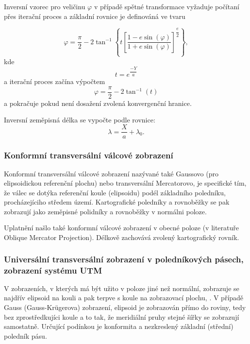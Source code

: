\documentclass[11pt,a4paper]{article}
\begin{document}
Inversní vzorec pro veličinu $\varphi$ v případě spětné transformace vyžaduje počítaní přes iterační proces a základní rovnice je definováná ve tvaru \cite{Snyder1987}

\begin{equation}
\varphi = \dfrac{\pi}{2} - 2 \tan^{-1}{\left\lbrace t \left[ \dfrac{1-e\sin{\left(\varphi\right)}}{1+e\sin{\left(\varphi\right)}} \right]^{\dfrac{e}{2}} \right\rbrace}, 
\end{equation}
kde
$$t = e^{\dfrac{-Y}{a}}$$
a iterační proces začína výpočtem
$$\varphi = \dfrac{\pi}{2}-2\tan^{-1}{\left(t\right)}$$
a pokračuje pokud není dosažení zvolená konvergenční hranice.

Inversní zeměpisná délka se vypočte podle rovnice:
\begin{equation}
\lambda = \dfrac{X}{a} + \lambda_{0}.
\end{equation} 

\subsubsection*{Konformní transversální válcové zobrazení}

Konformní transversální válcové zobrazení nazývané také Gaussovo (pro elipsoidickou referenční plochu) nebo transversální Mercatorovo, je specifické tím, že válec  se dotýka referenční koule (elipsoidu) podél základního poledníku, procházejíciho středem území. Kartografické poledníky a rovnoběžky se pak zobrazují jako zeměpisné polidníky a rovnoběžky v normálni poloze. 

Uplatnění našlo také konformní válcové zobrazení v obecné poloze (v literatuře Oblique Mercator Projection). Délkově zachovává zvolený kartografický rovník.

\subsubsection*{Universální transversální zobrazení v poledníkových pásech, zobrazení systému UTM}

V zobrazeních, v kterých má být užito v poloze jiné než normální, zobrazuje se najdřív elipsoid na kouli a pak terpve s koule na zobrazovací plochu, \cite{Buchar2002}. V případě Gauss (Gauss-Kr\"{u}gerova) zobrazení, elipsoid je zobrazován přímo do roviny, tedy bez zprostředkujíci koule a to tak, že meridiální pruhy stejné šířky se zobrazují samostatně. Určující podínkou je konformita a nezkreslený základní (střední) poledník pásu. 
\end{document}

